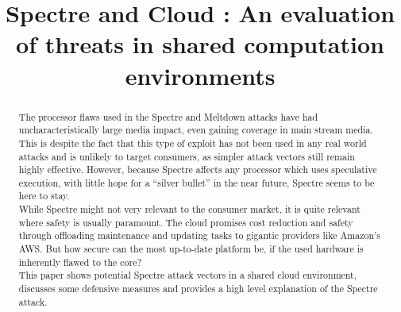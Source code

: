 \documentclass[conference,compsoc,final,a4paper]{IEEEtran}
\newcommand{\autoren}[0]{Mundhenke, Moritz}
\newcommand{\dokumententitel}[0]{Spectre and Cloud : An evaluation of threats in shared computation environments }
\begin{document}
\title{\dokumententitel}

\author{
  \IEEEauthorblockN{\autoren}
}

\maketitle
\thispagestyle{plain}
\pagestyle{plain}


\begin{abstract}
The processor flaws used in the Spectre and Meltdown attacks have had uncharacteristically large media impact, even gaining coverage in main stream media. This is despite the fact that this type of exploit has not been used in any real world attacks and is unlikely to target consumers, as simpler attack vectors still remain highly effective. However, because Spectre affects any processor which uses speculative execution, with little hope for a \enquote{silver bullet} in the near future, Spectre seems to be here to stay. \\
While Spectre might not very relevant to the consumer market, it is quite relevant where safety is usually paramount. The cloud promises cost reduction and safety through offloading maintenance and updating tasks to gigantic providers like Amazon's \acs{AWS}. But how secure can the most up-to-date platform be, if the used hardware is inherently flawed to the core? \\
This paper shows potential Spectre attack vectors in a shared cloud environment, discusses some defensive measures and provides a high level explanation of the Spectre attack.
\end{abstract}

\tableofcontents

\end{document}
